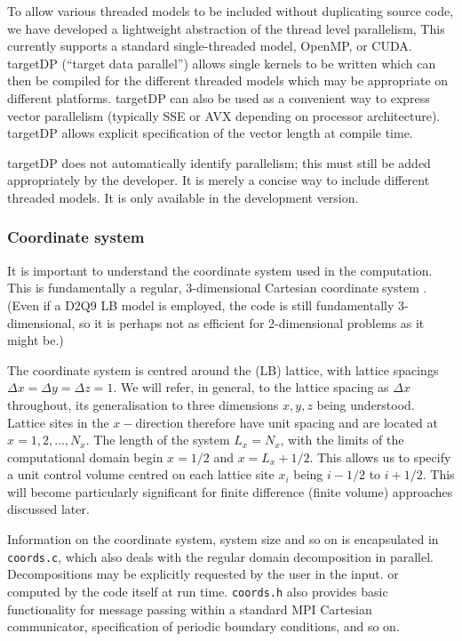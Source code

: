 To allow various threaded models to be included without duplicating
source code, we have developed a lightweight abstraction of the
thread level parallelism, This currently supports a standard single-threaded
model, OpenMP, or CUDA. targetDP (``target data parallel'') allows single
kernels to be written which can then be compiled for the different threaded
models which may be appropriate on different platforms. targetDP can also
be used as a convenient way to express vector parallelism
(typically SSE or AVX depending on processor architecture). targetDP allows
explicit specification of the vector length at compile time.

targetDP does not automatically identify parallelism; this must still be
added appropriately by the developer. It is merely a concise way to include
different threaded models. It is only available in the development version.

\subsubsection{Coordinate system}

It is important to understand the coordinate system used in the
computation. This is fundamentally a regular, 3-dimensional Cartesian
coordinate system . (Even if a D2Q9 LB model is employed, the code is
still fundamentally 3-dimensional, so it is perhaps not as efficient  
for 2-dimensional problems as it might be.)

The coordinate system is centred around the (LB) lattice, with lattice
spacings $\Delta x = \Delta y = \Delta z = 1$. We will refer, in general,
to the lattice spacing as $\Delta x$ throughout, its generalisation to
three dimensions $x,y,z$ being understood. Lattice sites in the
$x-$direction therefore have unit spacing and are located at
$x = 1, 2, \ldots, N_x$.
The length of the system $L_x = N_x$, with the limits of
the computational domain begin $x = 1/2$ and $x = L_x + 1/2$. This allows
us to specify a unit control volume centred on each lattice site $x_i$
being $i-1/2$ to $i + 1/2$. This will become particularly significant for
finite difference (finite volume) approaches discussed later.

Information on the coordinate system, system size and so on is
encapsulated in \texttt{coords.c}, which also deals with the
regular domain decomposition in parallel. Decompositions may be
explicitly requested by the user in the input. or computed by
the code itself at run time. \texttt{coords.h} also provides
basic functionality for message passing within a standard MPI
Cartesian communicator, specification of periodic boundary
conditions, and so on.

